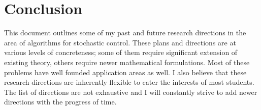 \documentclass[onecolumn,12pt]{IEEEtran}
\begin{document}
\section{Conclusion}
This document outlines some of my past and future research directions in the area of algorithms for stochastic control. These plans and directions are at various levels of concreteness; some of them require significant extension of existing theory, others require newer mathematical formulations. Most of these problems have well founded application areas as well. I also believe that these research directions are inherently flexible to cater the interests of most students. The list of directions are not exhaustive and I will constantly strive to add newer directions with the progress of time.


\end{document}

